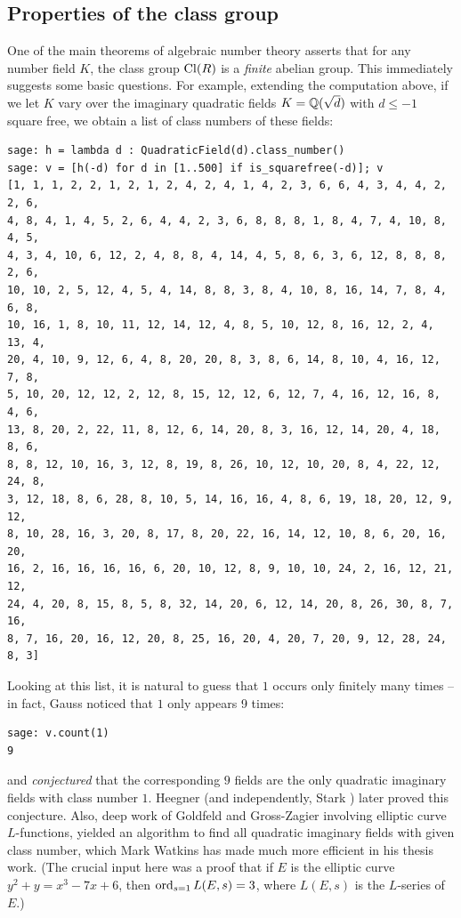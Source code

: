 \documentclass{book}
\begin{document}
\subsection{Properties of the class group}
One of the main theorems of algebraic number theory asserts that
for any number field $K$, the class group $\operatorname{Cl}(R)$ is a {\em finite}
abelian group.   This immediately suggests some basic questions.
For example, extending the computation above,
if we let $K$ vary over the imaginary quadratic fields
$K=\mathbb{Q}(\sqrt{d})$ with $d\leq -1$ square free, we obtain
a list of class numbers of these fields:
\begin{lstlisting}
sage: h = lambda d : QuadraticField(d).class_number()
sage: v = [h(-d) for d in [1..500] if is_squarefree(-d)]; v
[1, 1, 1, 2, 2, 1, 2, 1, 2, 4, 2, 4, 1, 4, 2, 3, 6, 6, 4, 3, 4, 4, 2, 2, 6,
4, 8, 4, 1, 4, 5, 2, 6, 4, 4, 2, 3, 6, 8, 8, 8, 1, 8, 4, 7, 4, 10, 8, 4, 5,
4, 3, 4, 10, 6, 12, 2, 4, 8, 8, 4, 14, 4, 5, 8, 6, 3, 6, 12, 8, 8, 8, 2, 6,
10, 10, 2, 5, 12, 4, 5, 4, 14, 8, 8, 3, 8, 4, 10, 8, 16, 14, 7, 8, 4, 6, 8,
10, 16, 1, 8, 10, 11, 12, 14, 12, 4, 8, 5, 10, 12, 8, 16, 12, 2, 4, 13, 4,
20, 4, 10, 9, 12, 6, 4, 8, 20, 20, 8, 3, 8, 6, 14, 8, 10, 4, 16, 12, 7, 8,
5, 10, 20, 12, 12, 2, 12, 8, 15, 12, 12, 6, 12, 7, 4, 16, 12, 16, 8, 4, 6,
13, 8, 20, 2, 22, 11, 8, 12, 6, 14, 20, 8, 3, 16, 12, 14, 20, 4, 18, 8, 6,
8, 8, 12, 10, 16, 3, 12, 8, 19, 8, 26, 10, 12, 10, 20, 8, 4, 22, 12, 24, 8,
3, 12, 18, 8, 6, 28, 8, 10, 5, 14, 16, 16, 4, 8, 6, 19, 18, 20, 12, 9, 12,
8, 10, 28, 16, 3, 20, 8, 17, 8, 20, 22, 16, 14, 12, 10, 8, 6, 20, 16, 20,
16, 2, 16, 16, 16, 16, 6, 20, 10, 12, 8, 9, 10, 10, 24, 2, 16, 12, 21, 12,
24, 4, 20, 8, 15, 8, 5, 8, 32, 14, 20, 6, 12, 14, 20, 8, 26, 30, 8, 7, 16,
8, 7, 16, 20, 16, 12, 20, 8, 25, 16, 20, 4, 20, 7, 20, 9, 12, 28, 24, 8, 3]
\end{lstlisting}
Looking at this list, it is natural to guess that $1$ occurs only finitely
many times -- in fact, Gauss noticed that $1$ only appears 9 times:
\begin{lstlisting}
sage: v.count(1)
9
\end{lstlisting}
and {\em conjectured} that the corresponding $9$ fields are the only
quadratic imaginary fields with class number $1$.
Heegner \cite{heegner1952diophantische} (and independently, Stark \cite{stark1969gap}) later proved this conjecture.
Also, deep work of Goldfeld and Gross-Zagier involving elliptic
curve $L$-functions, yielded an algorithm to find all quadratic
imaginary fields with given class number, which Mark Watkins has made
much more efficient in his thesis work.  (The crucial input here
was a proof that if $E$ is the elliptic curve $y^2 + y = x^3 - 7x + 6$,
then $\operatorname{ord}_{s=1}L(E,s)=3$, where $L(E,s)$ is the $L$-series
of $E$.)
\end{document}
